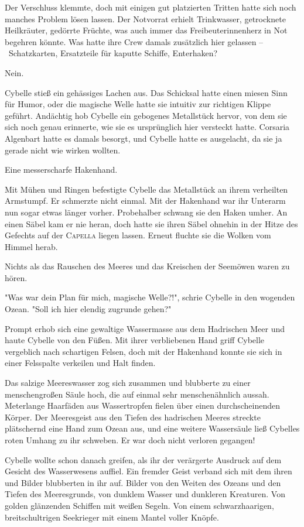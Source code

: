 Der Verschluss klemmte, doch mit einigen gut platzierten Tritten hatte sich noch manches Problem lösen lassen. Der Notvorrat erhielt Trinkwasser, getrocknete Heilkräuter, gedörrte Früchte, was auch immer das Freibeuterinnenherz in Not begehren könnte. Was hatte ihre Crew damals zusätzlich hier gelassen – Schatzkarten, Ersatzteile für kaputte Schiffe, Enterhaken? 

Nein. 

Cybelle stieß ein gehässiges Lachen aus. Das Schicksal hatte einen miesen Sinn für Humor, oder die magische Welle hatte sie intuitiv zur richtigen Klippe geführt. Andächtig hob Cybelle ein gebogenes Metallstück hervor, von dem sie sich noch genau erinnerte, wie sie es ursprünglich hier versteckt hatte. Corsaria Algenbart hatte es damals besorgt, und Cybelle hatte es ausgelacht, da sie ja gerade nicht wie  wirken wollten.

Eine messerscharfe Hakenhand.

Mit Mühen und Ringen befestigte Cybelle das Metallstück an ihrem verheilten Armstumpf. Er schmerzte nicht einmal. Mit der Hakenhand war ihr Unterarm nun sogar etwas länger vorher. Probehalber schwang sie den Haken umher. An einen Säbel kam er nie heran, doch hatte sie ihren Säbel ohnehin in der Hitze des Gefechts auf der \textsc{Capella} liegen lassen. Erneut fluchte sie die Wolken vom Himmel herab.

Nichts als das Rauschen des Meeres und das Kreischen der Seemöwen waren zu hören.

"Was war dein Plan für mich, magische Welle?!", schrie Cybelle in den wogenden Ozean. "Soll ich hier elendig zugrunde gehen?"

Prompt erhob sich eine gewaltige Wassermasse aus dem Hadrischen Meer und haute Cybelle von den Füßen. Mit ihrer verbliebenen Hand griff Cybelle vergeblich nach schartigen Felsen, doch mit der Hakenhand konnte sie sich in einer Felsspalte verkeilen und Halt finden.

Das salzige Meereswasser zog sich zusammen und blubberte zu einer menschengroßen Säule hoch, die auf einmal sehr menschenähnlich aussah. Meterlange Haarfäden aus Wassertropfen fielen über einen durchscheinenden Körper. Der Meeresgeist aus den Tiefen des hadrischen Meeres streckte plätschernd eine Hand zum Ozean aus, und eine weitere Wassersäule ließ Cybelles roten Umhang zu ihr schweben. Er war doch nicht verloren gegangen!

Cybelle wollte schon danach greifen, als ihr der verärgerte Ausdruck auf dem Gesicht des Wasserwesens auffiel. Ein fremder Geist verband sich mit dem ihren und Bilder blubberten in ihr auf. Bilder von den Weiten des Ozeans und den Tiefen des Meeresgrunds, von dunklem Wasser und dunkleren Kreaturen. Von golden glänzenden Schiffen mit weißen Segeln. Von einem schwarzhaarigen, breitschultrigen Seekrieger mit einem Mantel voller Knöpfe. 

